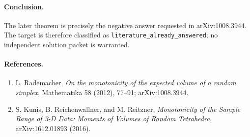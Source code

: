 \documentclass[11pt]{article}
\begin{document}
\paragraph{Conclusion.}
The later theorem is precisely the negative answer requested in
arXiv:1008.3944.  The target is therefore classified as
\texttt{literature\_already\_answered}; no independent solution packet is
warranted.

\paragraph{References.}
\begin{enumerate}
\item L. Rademacher, \emph{On the monotonicity of the expected volume of a
random simplex}, Mathematika 58 (2012), 77--91; arXiv:1008.3944.
\item S. Kunis, B. Reichenwallner, and M. Reitzner, \emph{Monotonicity of the
Sample Range of 3-D Data: Moments of Volumes of Random Tetrahedra},
arXiv:1612.01893 (2016).
\end{enumerate}
\end{document}

